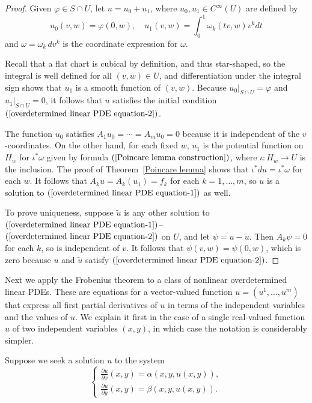 \begin{proof}
Given $\varphi\in S\cap U$, let $u=u_0+u_1$, where $u_0,u_1\in C^\infty(U)$ are defined by
\[u_0(v,w)=\varphi(0,w),\quad u_1(v,w)=\int_{0}^{1}\omega_k(tv,w)v^kdt\]
and $\omega=\omega_k\,dv^k$ is the coordinate expression for $\omega$.\par
Recall that a flat chart is cubical by definition, and thus star-shaped, so the integral is well defined for all $(v,w)\in U$, and differentiation under the integral sign shows that $u_1$ is a smooth function of $(v,w)$. Because $u_0|_{S\cap U}=\varphi$ and $u_1|_{S\cap U}=0$, it follows that $u$ satisfies the initial condition $(\ref{overdetermined linear PDE equation-2})$.\par
The function $u_0$ satisfies $A_1u_0=\cdots=A_mu_0=0$ because it is independent of the $v$-coordinates. On the other hand, for each fixed $w$, $u_1$ is the potential function on $H_w$ for $\iota^*\omega$ given by formula $(\ref{Poincare lemma construction})$, where $\iota:H_w\to U$ is the inclusion. The proof of Theorem~\ref{Poincare lemma} shows that $\iota^*du=\iota^*\omega$ for each $w$. It follows that $A_ku=A_k(u_1)=f_k$ for each $k=1,\dots,m$, so $u$ is a solution to $(\ref{overdetermined linear PDE equation-1})$ as well.\par
To prove uniqueness, suppose $\widetilde{u}$ is any other solution to $(\ref{overdetermined linear PDE equation-1})$--$(\ref{overdetermined linear PDE equation-2})$ on $U$, and let $\psi=u-\widetilde{u}$. Then $A_k\psi=0$ for each $k$, so is independent of $v$. It follows that $\psi(v,w)=\psi(0,w)$, which is zero because $u$ and $\widetilde{u}$ satisfy $(\ref{overdetermined linear PDE equation-2})$.
\end{proof}
Next we apply the Frobenius theorem to a class of nonlinear overdetermined linear PDEs. These are equations for a vector-valued function $u=(u^1,\dots,u^m)$ that express all first partial derivatives of $u$ in terms of the independent variables and the values of $u$. We explain it first in the case of a single real-valued function $u$ of two independent variables $(x,y)$, in which case the notation is considerably simpler.\par
Suppose we seek a solution $u$ to the system
\begin{equation}\label{overdetermined nonlinear PDE two dim}
\left\{
\begin{aligned}
\frac{\partial u}{\partial x}(x,y)=\alpha(x,y,u(x,y)),\\[4pt]
\frac{\partial u}{\partial y}(x,y)=\beta(x,y,u(x,y)).
\end{aligned}
\right. 
\end{equation}
